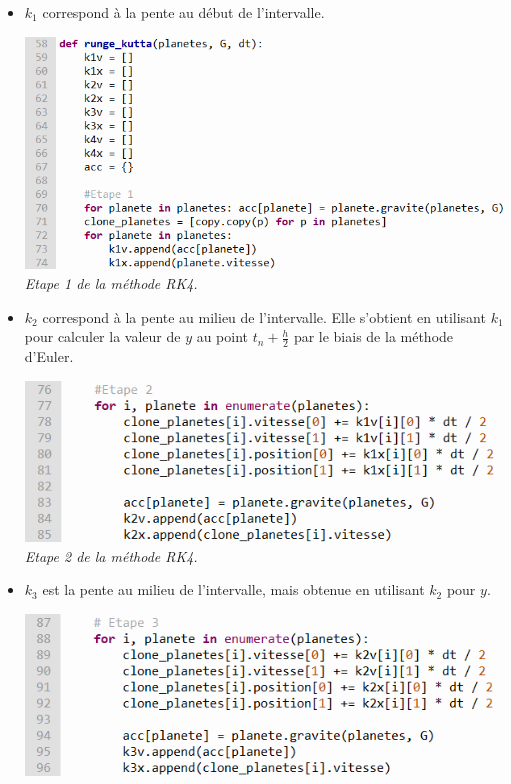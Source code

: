 \documentclass{article}
\begin{document}
            \begin{itemize}
                \item $k_1$ correspond à la pente au début de l'intervalle.
                \begin{center}
                    \includegraphics[scale=0.5]{RK4partie1.png} \\
                    \emph{Etape 1 de la méthode RK4.}
                \end{center}
                \item $k_2$ correspond à la pente au milieu de l'intervalle. Elle s'obtient en utilisant $k_1$ pour calculer la valeur de $y$ au point $t_n + \frac{h}{2}$ par le biais de la méthode d'Euler.
                \begin{center}
                    \includegraphics[scale=0.5]{RK4partie2.png} \\
                    \emph{Etape 2 de la méthode RK4.}
                \end{center}
                \item $k_3$ est la pente au milieu de l'intervalle, mais obtenue en utilisant $k_2$ pour $y$.
                \begin{center}
                    \includegraphics[scale=0.5]{RK4partie3.png} \\

\end{center}
\end{itemize}
\end{document}
